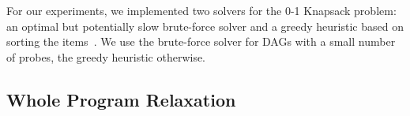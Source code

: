 



For our experiments, we implemented two solvers for the 0-1 Knapsack problem: an optimal but potentially slow brute-force solver and a
greedy heuristic based on sorting the items~\citep{dantzig57}. We use the brute-force solver for DAGs with a small number of probes, the
greedy heuristic otherwise.

\subsection{Whole Program Relaxation}


